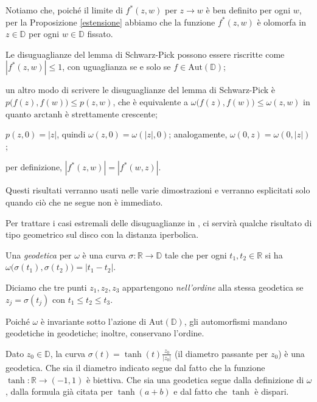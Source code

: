 Notiamo che, poiché il limite di $f^*(z,w)$ per $z \longrightarrow w$ è ben definito per ogni $w$, per la Proposizione \ref{estensione} abbiamo che la funzione $f^*(z,w)$ è olomorfa in $z \in \mathbb{D}$ per ogni $w \in \mathbb{D}$ fissato.

\begin{oss} \label{oss1}
  \begin{nlist}
    \item Le disuguaglianze del lemma di Schwarz-Pick possono essere riscritte come $|f^*(z,w)| \le 1$, con uguaglianza se e solo se $f \in \text{Aut}(\mathbb{D})$;
    \item  un altro modo di scrivere le disuguaglianze del lemma di Schwarz-Pick è $p\bigl(f(z),f(w)\bigr) \le p(z,w)$, che è equivalente a $\omega\bigl(f(z),f(w)\bigr) \le \omega(z,w)$ in quanto $\text{arctanh}$ è strettamente crescente;
    \item $p(z,0)=|z|$, quindi $\omega(z,0)=\omega(|z|,0)$; analogamente, $\omega(0,z)=\omega(0,|z|)$;
    \item per definizione, $|f^*(z,w)|=|f^*(w,z)|$.
  \end{nlist}
  Questi risultati verranno usati nelle varie dimostrazioni e verranno esplicitati solo quando ciò che ne segue non è immediato.
\end{oss}

Per trattare i casi estremali delle disuguaglianze in \cite{BM}, ci servirà qualche risultato di tipo geometrico sul disco con la distanza iperbolica.

\begin{defn}
  Una \textit{geodetica} per $\omega$ è una curva $\sigma: \mathbb{R} \longrightarrow \mathbb{D}$ tale che per ogni $t_1,t_2 \in \mathbb{R}$ si ha $\omega\bigl(\sigma(t_1),\sigma(t_2)\bigr)=|t_1-t_2|$.

  Diciamo che tre punti $z_1, z_2, z_3$ appartengono \textit{nell'ordine} alla stessa geodetica se $z_j=\sigma(t_j)$ con $t_1 \le t_2 \le t_3$.
\end{defn}

\begin{oss} \label{geoingeo}
  Poiché $\omega$ è invariante sotto l'azione di $\text{Aut}(\mathbb{D})$, gli automorfismi mandano geodetiche in geodetiche; inoltre, conservano l'ordine.
\end{oss}

\begin{ex} \label{diam}
  Dato $z_0 \in \mathbb{D}$, la curva $\sigma(t)=\tanh(t)\frac{z_0}{|z_0|}$ (il diametro passante per $z_0$) è una geodetica. Che sia il diametro indicato segue dal fatto che la funzione $\tanh:\mathbb{R} \longrightarrow (-1,1)$ è biettiva. Che sia una geodetica segue dalla definizione di $\omega$, dalla formula già citata per $\tanh(a+b)$ e dal fatto che $\tanh$ è dispari.
\end{ex}

